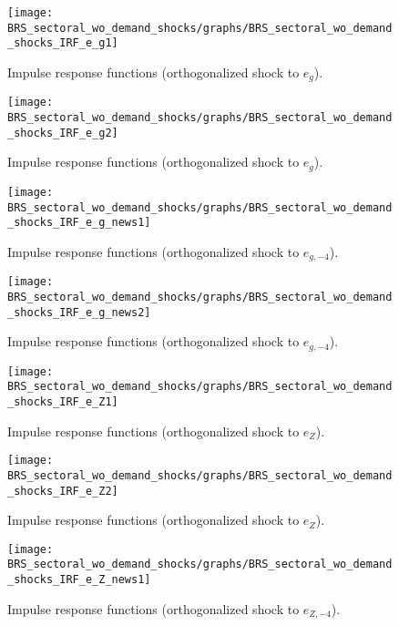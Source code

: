  
\begin{figure}[H]
\centering 
\texttt{[image: BRS\_sectoral\_wo\_demand\_shocks/graphs/BRS\_sectoral\_wo\_demand\_shocks\_IRF\_e\_g1]}
\caption{Impulse response functions (orthogonalized shock to ${e_g}$).}\label{Fig:IRF:e_g:1}
\end{figure}
 
\begin{figure}[H]
\centering 
\texttt{[image: BRS\_sectoral\_wo\_demand\_shocks/graphs/BRS\_sectoral\_wo\_demand\_shocks\_IRF\_e\_g2]}
\caption{Impulse response functions (orthogonalized shock to ${e_g}$).}\label{Fig:IRF:e_g:2}
\end{figure}
 
\begin{figure}[H]
\centering 
\texttt{[image: BRS\_sectoral\_wo\_demand\_shocks/graphs/BRS\_sectoral\_wo\_demand\_shocks\_IRF\_e\_g\_news1]}
\caption{Impulse response functions (orthogonalized shock to ${e_{g,-4}}$).}\label{Fig:IRF:e_g_news:1}
\end{figure}
 
\begin{figure}[H]
\centering 
\texttt{[image: BRS\_sectoral\_wo\_demand\_shocks/graphs/BRS\_sectoral\_wo\_demand\_shocks\_IRF\_e\_g\_news2]}
\caption{Impulse response functions (orthogonalized shock to ${e_{g,-4}}$).}\label{Fig:IRF:e_g_news:2}
\end{figure}
 
\begin{figure}[H]
\centering 
\texttt{[image: BRS\_sectoral\_wo\_demand\_shocks/graphs/BRS\_sectoral\_wo\_demand\_shocks\_IRF\_e\_Z1]}
\caption{Impulse response functions (orthogonalized shock to ${e_Z}$).}\label{Fig:IRF:e_Z:1}
\end{figure}
 
\begin{figure}[H]
\centering 
\texttt{[image: BRS\_sectoral\_wo\_demand\_shocks/graphs/BRS\_sectoral\_wo\_demand\_shocks\_IRF\_e\_Z2]}
\caption{Impulse response functions (orthogonalized shock to ${e_Z}$).}\label{Fig:IRF:e_Z:2}
\end{figure}
 
\begin{figure}[H]
\centering 
\texttt{[image: BRS\_sectoral\_wo\_demand\_shocks/graphs/BRS\_sectoral\_wo\_demand\_shocks\_IRF\_e\_Z\_news1]}
\caption{Impulse response functions (orthogonalized shock to ${e_{Z,-4}}$).}\label{Fig:IRF:e_Z_news:1}
\end{figure}
 
